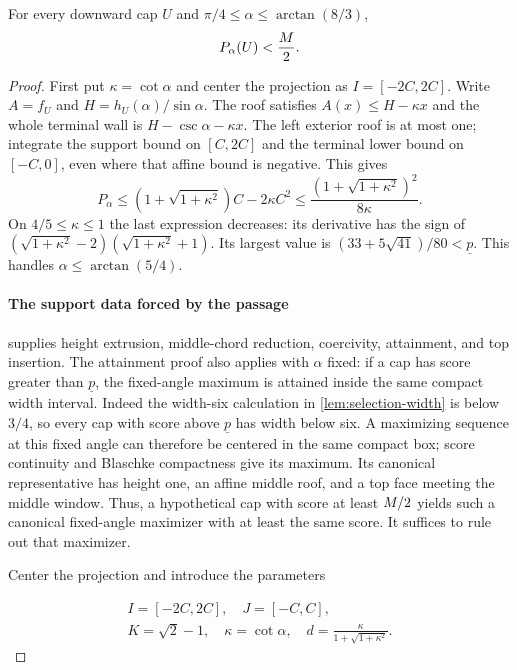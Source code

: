 \begin{proposition}\label{app:partial-initial}
For every downward cap $U$ and $\pi/4\le\alpha\le\arctan(8/3)$,
\[
 P_\alpha(U)<\frac{M}2.
\]
\end{proposition}
\begin{proof}
First put $\kappa=\cot\alpha$ and center the projection as
$I=[-2C,2C]$. Write $A=f_U$ and
$H=h_U(\alpha)/\sin\alpha$. The roof satisfies $A(x)\le H-\kappa x$
and the whole terminal wall is $H-\csc\alpha-\kappa x$.
The left exterior roof is at most one; integrate the support bound
on $[C,2C]$ and the terminal lower bound on $[-C,0]$, even where
that affine bound is negative. This gives
\[
 P_\alpha\le(1+\sqrt{1+\kappa^2})C-2\kappa C^2
 \le\frac{(1+\sqrt{1+\kappa^2})^2}{8\kappa}.
\]
On $4/5\le\kappa\le1$ the last expression decreases: its derivative
has the sign of $(\sqrt{1+\kappa^2}-2)(\sqrt{1+\kappa^2}+1)$.
Its largest value is $(33+5\sqrt{41})/80<\underline p$.
This handles $\alpha\le\arctan(5/4)$.

\paragraph{The support data forced by the passage}

 supplies height extrusion, middle-chord reduction, coercivity, attainment, and top insertion. The attainment proof also applies with
\(\alpha\) fixed: if a cap has score greater than \(\underline p\), the
fixed-angle maximum is attained inside the same compact width interval.
Indeed the width-six calculation in \cref{lem:selection-width}
is below $3/4$, so every cap with score above $\underline p$ has
width below six. A maximizing sequence at this fixed angle can
therefore be centered in the same compact box; score continuity
and Blaschke compactness give its maximum.
Its canonical representative has height one, an affine middle roof, and
a top face meeting the middle window. Thus, a hypothetical cap with score
at least \(M/2\) yields such a canonical fixed-angle maximizer
with at least the same score. It suffices to rule out that maximizer.


Center the projection and introduce the parameters

\begin{equation}\label{eq:partial-at-2}
\begin{gathered}
I=[-2C,2C],\quad J=[-C,C],\\
K=\sqrt2-1,\quad \kappa=\cot\alpha,\quad
d=\frac{\kappa}{1+\sqrt{1+\kappa^2}}.
\end{gathered}
\end{equation}


\end{proof}

